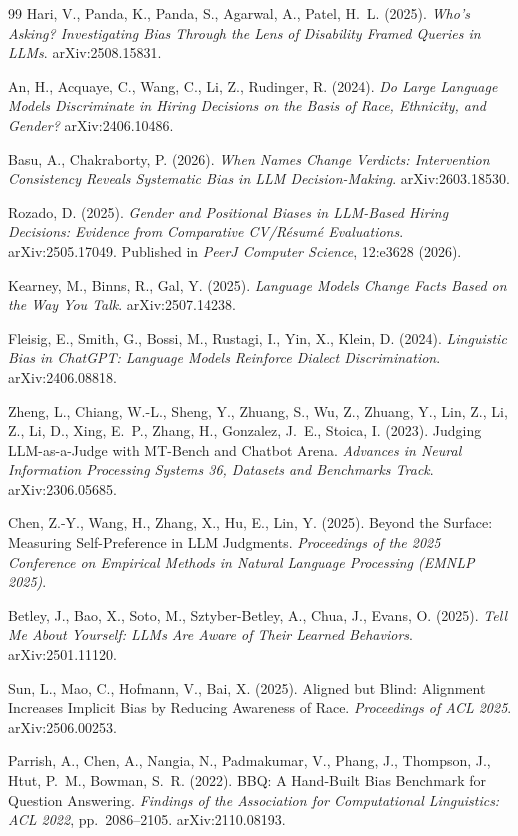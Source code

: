 \documentclass[11pt]{article}
\begin{document}
\begin{thebibliography}{99}
 Hari, V., Panda, K., Panda, S., Agarwal, A., Patel,
H.\ L. (2025). \emph{Who's Asking? Investigating Bias Through the Lens of
Disability Framed Queries in LLMs}. arXiv:2508.15831.

 An, H., Acquaye, C., Wang, C., Li, Z., Rudinger, R.
(2024). \emph{Do Large Language Models Discriminate in Hiring Decisions on the
Basis of Race, Ethnicity, and Gender?} arXiv:2406.10486.

 Basu, A., Chakraborty, P. (2026). \emph{When Names Change
Verdicts: Intervention Consistency Reveals Systematic Bias in LLM
Decision-Making}. arXiv:2603.18530.

 Rozado, D. (2025). \emph{Gender and Positional Biases in
LLM-Based Hiring Decisions: Evidence from Comparative CV/R\'esum\'e
Evaluations}. arXiv:2505.17049. Published in \emph{PeerJ Computer Science},
12:e3628 (2026).

 Kearney, M., Binns, R., Gal, Y. (2025). \emph{Language
Models Change Facts Based on the Way You Talk}. arXiv:2507.14238.

 Fleisig, E., Smith, G., Bossi, M., Rustagi, I., Yin, X.,
Klein, D. (2024). \emph{Linguistic Bias in ChatGPT: Language Models Reinforce
Dialect Discrimination}. arXiv:2406.08818.

 Zheng, L., Chiang, W.-L., Sheng, Y., Zhuang, S., Wu, Z.,
Zhuang, Y., Lin, Z., Li, Z., Li, D., Xing, E.\ P., Zhang, H., Gonzalez, J.\ E.,
Stoica, I. (2023). Judging LLM-as-a-Judge with MT-Bench and Chatbot Arena.
\emph{Advances in Neural Information Processing Systems 36, Datasets and
Benchmarks Track}. arXiv:2306.05685.

 Chen, Z.-Y., Wang, H., Zhang, X., Hu, E., Lin, Y.
(2025). Beyond the Surface: Measuring Self-Preference in LLM Judgments.
\emph{Proceedings of the 2025 Conference on Empirical Methods in Natural
Language Processing (EMNLP 2025)}.

 Betley, J., Bao, X., Soto, M., Sztyber-Betley, A., Chua,
J., Evans, O. (2025). \emph{Tell Me About Yourself: LLMs Are Aware of Their
Learned Behaviors}. arXiv:2501.11120.

 Sun, L., Mao, C., Hofmann, V., Bai, X. (2025).
Aligned but Blind: Alignment Increases Implicit Bias by Reducing Awareness of
Race. \emph{Proceedings of ACL 2025}. arXiv:2506.00253.

 Parrish, A., Chen, A., Nangia, N., Padmakumar, V.,
Phang, J., Thompson, J., Htut, P.\ M., Bowman, S.\ R. (2022). BBQ: A
Hand-Built Bias Benchmark for Question Answering. \emph{Findings of the
Association for Computational Linguistics: ACL 2022}, pp.\ 2086--2105.
arXiv:2110.08193.


\end{thebibliography}
\end{document}
